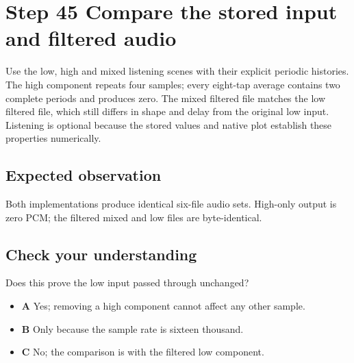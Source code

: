 \section{Step 45 Compare the stored input and filtered audio}\label{fir-s45}

Use the low, high and mixed listening scenes with their explicit periodic histories. The high component repeats four samples; every eight-tap average contains two complete periods and produces zero. The mixed filtered file matches the low filtered file, which still differs in shape and delay from the original low input. Listening is optional because the stored values and native plot establish these properties numerically.

\subsection{Expected observation}
Both implementations produce identical six-file audio sets. High-only output is zero PCM; the filtered mixed and low files are byte-identical.

\subsection{Check your understanding}
Does this prove the low input passed through unchanged?

\begin{itemize}
\item \textbf{A} Yes; removing a high component cannot affect any other sample.
\item \textbf{B} Only because the sample rate is sixteen thousand.
\item \textbf{C} No; the comparison is with the filtered low component.
\end{itemize}
